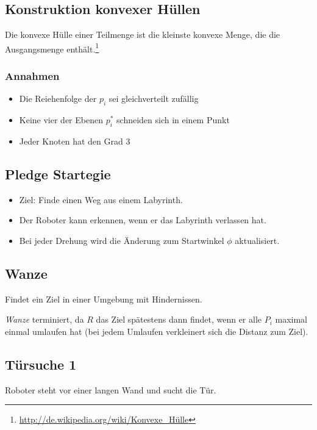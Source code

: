 \subsection{Konstruktion konvexer Hüllen}
Die konvexe Hülle einer Teilmenge ist die kleinste konvexe Menge, die die Ausgangsmenge enthält.\footnote{\url{http://de.wikipedia.org/wiki/Konvexe_Hülle}}

\subsubsection{Annahmen}
\begin{itemize}
	\item Die Reiehenfolge der \(p_i\) sei gleichverteilt zufällig
	\item Keine vier der Ebenen \(p_i^{*}\) schneiden sich in einem Punkt
	\item Jeder Knoten hat den Grad \(3\)
\end{itemize}



\subsection{Pledge Startegie}
\begin{itemize}
	\item Ziel: Finde einen Weg aus einem Labyrinth.
	\item Der Roboter kann erkennen, wenn er das Labyrinth verlassen hat.
	\item Bei jeder Drehung wird die Änderung zum Startwinkel \(\phi\) aktualisiert.
\end{itemize}



\subsection{Wanze}
Findet ein Ziel in einer Umgebung mit Hindernissen.


\textit{Wanze} terminiert, da \(R\) das Ziel spätestens dann findet, wenn er alle \(P_i\) maximal einmal umlaufen hat (bei jedem Umlaufen verkleinert sich die Distanz zum Ziel).


\subsection{Türsuche 1}
Roboter steht vor einer langen Wand und sucht die Tür.
\text{}\\



